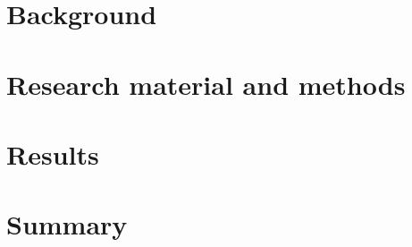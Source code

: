 \documentclass[english, 12pt, a4paper, sci, utf8, a-1b, online]{aaltothesis}
\begin{document}
\clearpage


\section{Background}

\clearpage


\section{Research material and methods}

\clearpage


\section{Results}

\clearpage

\section{Summary} 

\clearpage






\clearpage

\thesisappendix
\end{document}
